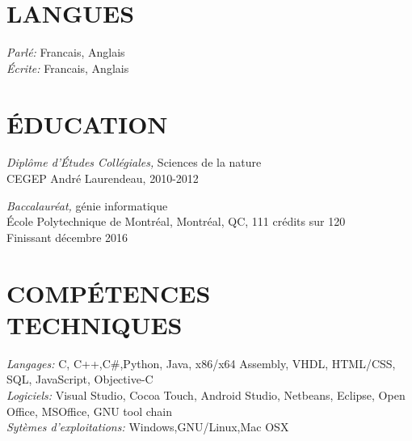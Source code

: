 \documentclass[margin, 10pt]{res} %
\begin{document}
\begin{resume}


\section{LANGUES}

{\sl Parl\'e:} Francais, Anglais \\
{\sl \'Ecrite:} Francais, Anglais


\section{\'EDUCATION}

{\sl Dipl\^ome d'\'Etudes Coll\'egiales,} Sciences de la nature \\
CEGEP Andr\'e Laurendeau, 2010-2012 

{\sl Baccalaur\'eat,} g\'enie informatique \\
\'Ecole Polytechnique de Montr\'eal, Montr\'eal, QC, 111 cr\'edits sur 120\\
Finissant d\'ecembre 2016
 

\section{COMP\'ETENCES\\ TECHNIQUES} 

{\sl Langages:} 
C, C++,C\#,Python, Java, x86/x64 Assembly, VHDL, HTML/CSS, SQL, JavaScript, Objective-C \\
{\sl Logiciels:} 
Visual Studio, Cocoa Touch, Android Studio, Netbeans, Eclipse, Open Office, MSOffice, GNU tool chain \\
{\sl Syt\`emes d'exploitations:} Windows,GNU/Linux,Mac OSX

 

\end{resume}
\end{document}
